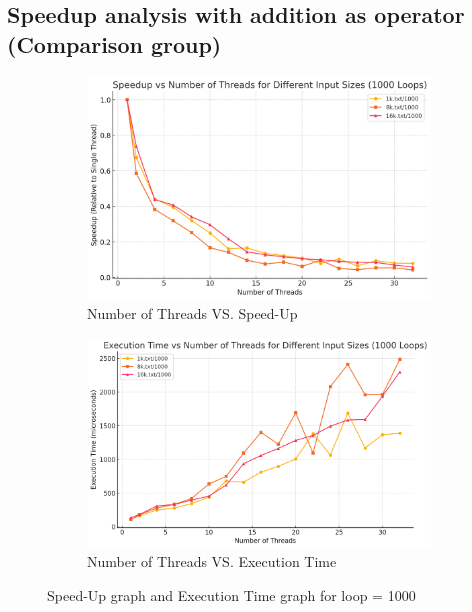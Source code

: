 \documentclass[letterpaper,12pt]{article}
\theoremstyle{remark}
\begin{document}
\subsection{Speedup analysis with addition as operator (Comparison group) }

\begin{figure}[H]
    \centering
    \begin{subfigure}[t]{0.48\textwidth}  %
        \centering
        \includegraphics[width=\textwidth]{additionAsOpLoop1000Speedup.png}
        \caption{Number of Threads VS. Speed-Up}
        \label{fig:ThreadVsSpeedUp1}
    \end{subfigure}
    \hfill  %
    \begin{subfigure}[t]{0.48\textwidth}  %
        \centering
        \includegraphics[width=\textwidth]{additionAsOpLoop1000Exe.png}
        \caption{Number of Threads VS. Execution Time}
        \label{fig:ThreadVsExecutionTime}
    \end{subfigure}
    \caption{Speed-Up graph and Execution Time graph for loop = 1000}
    \label{fig:ThreadVsComparison}
\end{figure}
\hfill  %
\end{document}
